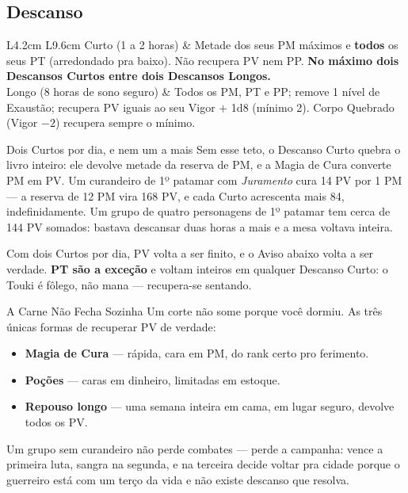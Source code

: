 \subsection{Descanso}

\begin{tabelalivro}{L{4.2cm} L{9.6cm}}{}
Curto (1 a 2 horas) & Metade dos seus PM máximos e \textbf{todos} os seus PT (arredondado pra baixo). Não recupera PV nem PP. \textbf{No máximo dois Descansos Curtos entre dois Descansos Longos.} \\
Longo (8 horas de sono seguro) & Todos os PM, PT e PP; remove 1 nível de Exaustão; recupera PV iguais ao seu Vigor $+$ 1d8 (mínimo 2). Corpo Quebrado (Vigor $-2$) recupera sempre o mínimo. \\
\end{tabelalivro}

\begin{aviso}{Dois Curtos por dia, e nem um a mais}
    Sem esse teto, o Descanso Curto quebra o livro inteiro: ele devolve metade da reserva de
    PM, e a Magia de Cura converte PM em PV. Um curandeiro de 1º patamar com \emph{Juramento}
    cura 14 PV por 1 PM --- a reserva de 12 PM vira 168 PV, e cada Curto acrescenta mais 84,
    indefinidamente. Um grupo de quatro personagens de 1º patamar tem cerca de 144 PV
    somados: bastava descansar duas horas a mais e a mesa voltava inteira.

    \medskip
    Com dois Curtos por dia, PV volta a ser finito, e o Aviso abaixo volta a ser verdade.
    \textbf{PT são a exceção} e voltam inteiros em qualquer Descanso Curto: o Touki é fôlego,
    não mana --- recupera-se sentando.
\end{aviso}

\begin{aviso}{A Carne Não Fecha Sozinha}
    Um corte não some porque você dormiu. As três únicas formas de recuperar PV de verdade:

    \begin{itemize}
        \item \textbf{Magia de Cura} --- rápida, cara em PM, do rank certo pro ferimento.
        \item \textbf{Poções} --- caras em dinheiro, limitadas em estoque.
        \item \textbf{Repouso longo} --- uma semana inteira em cama, em lugar seguro,
              devolve todos os PV.
    \end{itemize}

    Um grupo sem curandeiro não perde combates --- perde a campanha: vence a primeira luta,
    sangra na segunda, e na terceira decide voltar pra cidade porque o guerreiro está com um
    terço da vida e não existe descanso que resolva.
\end{aviso}

